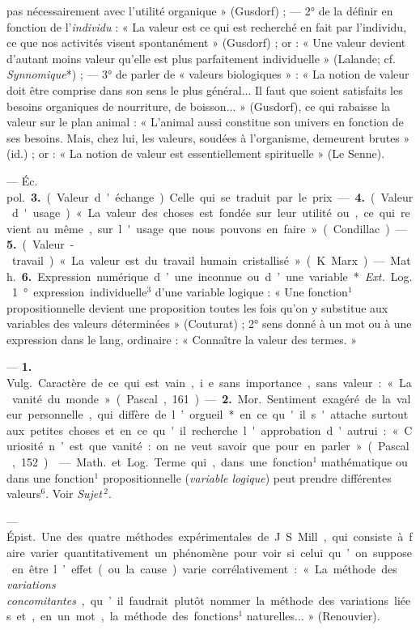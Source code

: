 \begin{itemize}[leftmargin=1cm, label=, itemsep=1pt]
[même] pas nécessairement avec l'utilité organique » (Gusdorf) ; — 2° de la
définir en fonction de l'{\it individu} : « La valeur est ce qui est
recherché en fait par l'individu, ce que nos activités visent spontanément
» (Gusdorf) ; or : « Une valeur devient d'autant moins valeur qu’elle est
plus parfaitement individuelle » (Lalande; cf. {\it Synnomique}*) ; — 3° de
parler de « valeurs biologiques » : « La notion de valeur doit être comprise
dans son sens le plus général... Il faut que soient satisfaits les besoins
organiques de nourriture, de boisson... » (Gusdorf), ce qui rabaisse la
valeur sur le plan animal : « L'animal aussi constitue son univers en
fonction de ses besoins. Mais, chez lui, les valeurs, soudées à l'organisme,
demeurent brutes » (id.) ; or : « La notion de valeur est essentiellement
spirituelle » (Le Senne).

— \si{Éc. pol.}  {\bf 3.} (Valeur d'échange). Celle qui se traduit par le
prix. —  {\bf 4.} (Valeur d'usage). « La valeur des choses est fondée sur
leur utilité ou, ce qui revient au même, sur l'usage
que nous pouvons en faire » (Condillac). —  {\bf 5.} (Valeur-travail). « La
valeur est du travail humain cristallisé » (K. Marx).

— \si{Math.}  {\bf 6.} Expression numérique d’une inconnue ou d’une
variable*. {\it Ext.} \si{Log.} 1° expression individuelle$^3$ d’une variable
logique : « Une fonction$^1$ propositionnelle devient une proposition toutes
les fois qu'on y substitue aux variables des valeurs déterminées
» (Couturat) ; 2° sens donné à un mot ou à une expression dans le lang,
ordinaire : « Connaître la valeur des termes. »

 — {\bf 1.} \si{Vulg.} Caractère de ce qui est vain, i.e. sans
importance, sans valeur : « La vanité du monde » (Pascal, 161). — {\bf 2.}
\si{Mor.} Sentiment exagéré de la valeur personnelle, qui diffère de
l’orgueil* en ce qu'il s'attache surtout aux petites choses et en ce qu'il
recherche l'approbation d'autrui : « Curiosité n’est que vanité : on ne veut
savoir que pour en parler » (Pascal, 152).

 — \si{Math.} et \si{Log.} Terme qui, dans une fonction$^1$
mathématique ou dans une fonction$^1$ propositionnelle ({\it variable
logique}) peut prendre différentes valeurs$^6$. Voir {\it Sujet}$\,^2$.

 — \si{Épist.} Une des quatre
méthodes expérimentales de J. S. Mill, qui consiste à faire varier
quantitativement un phénomène pour voir si celui qu’on suppose en être
l’effet (ou la cause) varie corrélativement : « La méthode des {\it
variations concomitantes}, qu’il faudrait plutôt nommer la méthode des
variations liées et, en un mot, la méthode des fonctions$^1$ naturelles...
» (Renouvier).


\end{itemize}
